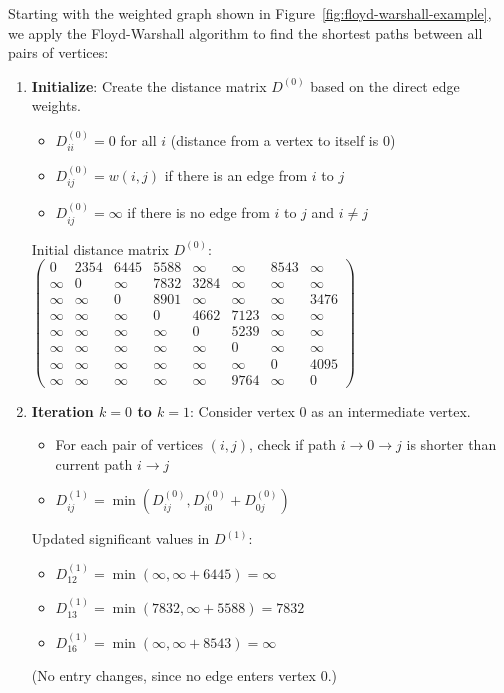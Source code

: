 \documentclass{article}
\theoremstyle{definition}
\begin{document}
Starting with the weighted graph shown in Figure~\ref{fig:floyd-warshall-example}, we apply the Floyd-Warshall algorithm to find the shortest paths between all pairs of vertices:

\begin{enumerate}
\item \textbf{Initialize}: Create the distance matrix $D^{(0)}$ based on the direct edge weights.
   \begin{itemize}
   \item $D^{(0)}_{ii} = 0$ for all $i$ (distance from a vertex to itself is 0)
   \item $D^{(0)}_{ij} = w(i,j)$ if there is an edge from $i$ to $j$
   \item $D^{(0)}_{ij} = \infty$ if there is no edge from $i$ to $j$ and $i \neq j$
   \end{itemize}

   Initial distance matrix $D^{(0)}$:
   $\begin{pmatrix}
   0 & 2354 & 6445 & 5588 & \infty & \infty & 8543 & \infty \\
   \infty & 0 & \infty & 7832 & 3284 & \infty & \infty & \infty \\
   \infty & \infty & 0 & 8901 & \infty & \infty & \infty & 3476 \\
   \infty & \infty & \infty & 0 & 4662 & 7123 & \infty & \infty \\
   \infty & \infty & \infty & \infty & 0 & 5239 & \infty & \infty \\
   \infty & \infty & \infty & \infty & \infty & 0 & \infty & \infty \\
   \infty & \infty & \infty & \infty & \infty & \infty & 0 & 4095 \\
   \infty & \infty & \infty & \infty & \infty & 9764 & \infty & 0
   \end{pmatrix}$

\item \textbf{Iteration $k=0$ to $k=1$}: Consider vertex 0 as an intermediate vertex.
   \begin{itemize}
   \item For each pair of vertices $(i,j)$, check if path $i \rightarrow 0 \rightarrow j$ is shorter than current path $i \rightarrow j$
   \item $D^{(1)}_{ij} = \min(D^{(0)}_{ij}, D^{(0)}_{i0} + D^{(0)}_{0j})$
   \end{itemize}

   Updated significant values in $D^{(1)}$:
   \begin{itemize}
   \item $D^{(1)}_{12} = \min(\infty, \infty + 6445) = \infty$
   \item $D^{(1)}_{13} = \min(7832, \infty + 5588) = 7832$
   \item $D^{(1)}_{16} = \min(\infty, \infty + 8543) = \infty$
   \end{itemize}
   (No entry changes, since no edge enters vertex 0.)


\end{enumerate}
\end{document}
